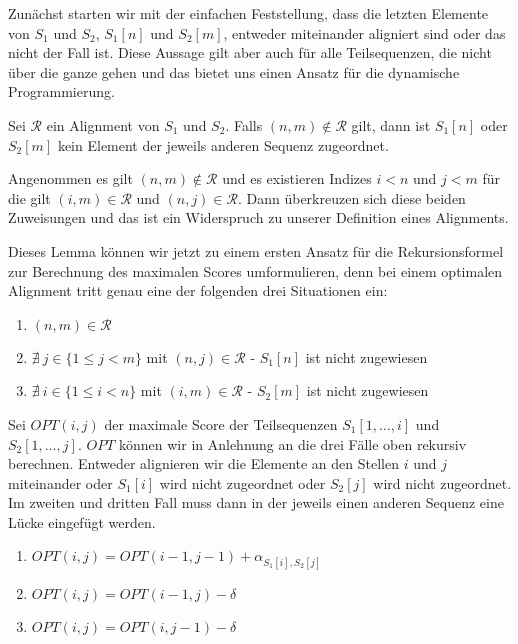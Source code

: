 Zunächst starten wir mit der einfachen Feststellung, dass die letzten Elemente von $S_1$ und $S_2$, $S_1[n]$ und $S_2[m]$, entweder miteinander aligniert sind oder das nicht der Fall ist. Diese Aussage gilt aber auch für alle Teilsequenzen, die nicht über die ganze gehen und das bietet uns einen Ansatz für die dynamische Programmierung. 

\begin{lemma}
	Sei $\mathcal{R}$ ein Alignment von $S_1$ und $S_2$. Falls $(n,m) \notin \mathcal{R}$ gilt, dann ist $S_1[n]$ oder $S_2[m]$ kein Element der jeweils anderen Sequenz zugeordnet. 
\end{lemma}

\begin{beweis}
	Angenommen es gilt $(n,m) \notin \mathcal{R}$ und es existieren Indizes $i < n$ und $j < m$ für die gilt $(i,m) \in \mathcal{R}$ und $(n,j) \in \mathcal{R}$. Dann überkreuzen sich diese beiden Zuweisungen und das ist ein Widerspruch zu unserer Definition eines  Alignments.
\end{beweis}

Dieses Lemma können wir jetzt zu einem ersten Ansatz für die Rekursionsformel zur Berechnung des maximalen Scores umformulieren, denn bei einem optimalen Alignment tritt genau eine der folgenden drei Situationen ein:

\begin{enumerate}[topsep=0pt,itemsep=-1ex,partopsep=1ex,parsep=1ex]
	\item $(n,m) \in \mathcal{R}$
	\item $\nexists\: j \in \{1 \leq j < m\}$ mit $(n,j) \in \mathcal{R}$ - $S_1[n]$ ist nicht zugewiesen
	\item $\nexists\: i \in \{1 \leq i < n\}$ mit $(i,m) \in \mathcal{R}$ - $S_2[m]$ ist nicht zugewiesen
\end{enumerate}

Sei $OPT(i,j)$ der maximale Score der Teilsequenzen $S_1[1,\dots,i]$ und $S_2[1,\dots,j]$. $OPT$ können wir in Anlehnung an die drei Fälle oben rekursiv berechnen. Entweder alignieren wir die Elemente an den Stellen $i$ und $j$ miteinander oder $S_1[i]$ wird nicht zugeordnet oder $S_2[j]$ wird nicht zugeordnet. Im zweiten und dritten Fall muss dann in der jeweils einen anderen Sequenz eine Lücke eingefügt werden.

\begin{enumerate}[topsep=0pt,itemsep=-1ex,partopsep=1ex,parsep=1ex]
	\item $OPT(i,j) = OPT(i-1,j-1) + \alpha_{S_1[i],S_2[j]}$
	\item $OPT(i,j) = OPT(i-1,j) - \delta$
	\item $OPT(i,j) = OPT(i,j-1) - \delta$
\end{enumerate}

